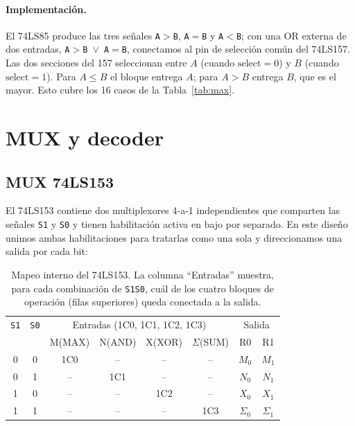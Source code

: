 \documentclass[a4paper,12pt]{article}
\begin{document}
\paragraph{Implementaci\'{o}n.} El 74LS85 produce las tres se\~{n}ales
\texttt{A$>$B}, \texttt{A$=$B} y \texttt{A$<$B}; con una OR externa de
dos entradas, \texttt{A$>$B $\lor$ A$=$B}, conectamos al pin de
selecci\'{o}n com\'{u}n del 74LS157. Las dos secciones del 157
seleccionan entre $A$ (cuando $\text{select}=0$) y $B$ (cuando
$\text{select}=1$). Para $A \le B$ el bloque entrega $A$; para $A > B$
entrega $B$, que es el mayor. Esto cubre los 16 casos de la
Tabla~\ref{tab:max}.

\section{MUX y decoder}

\subsection{MUX 74LS153}
El 74LS153 contiene dos multiplexores 4-a-1 independientes que comparten
las se\~{n}ales \texttt{S1} y \texttt{S0} y tienen habilitaci\'{o}n
activa en bajo por separado. En este dise\~{n}o unimos ambas
habilitaciones para tratarlas como una sola y direccionamos una salida
por cada bit:

\begin{table}[H]
\centering
\small
\begin{tabular}{cc|cccc|cc}
\toprule
\texttt{S1} & \texttt{S0} &
\multicolumn{4}{c|}{Entradas (1C0, 1C1, 1C2, 1C3)} &
\multicolumn{2}{c}{Salida} \\
& & \footnotesize M(MAX) & \footnotesize N(AND) & \footnotesize X(XOR) & \footnotesize $\Sigma$(SUM) & \footnotesize R0 & \footnotesize R1 \\
\midrule
0 & 0 & 1C0 & --  & --   & --   & $M_0$ & $M_1$ \\
0 & 1 & --  & 1C1 & --   & --   & $N_0$ & $N_1$ \\
1 & 0 & --  & --  & 1C2  & --   & $X_0$ & $X_1$ \\
1 & 1 & --  & --  & --   & 1C3  & $\Sigma_0$ & $\Sigma_1$ \\
\bottomrule
\end{tabular}
\caption{Mapeo interno del 74LS153. La columna ``Entradas'' muestra, para
cada combinaci\'{o}n de \texttt{S1S0}, cu\'{a}l de los cuatro bloques de
operaci\'{o}n (filas superiores) queda conectada a la salida.}
\end{table}
\end{document}
